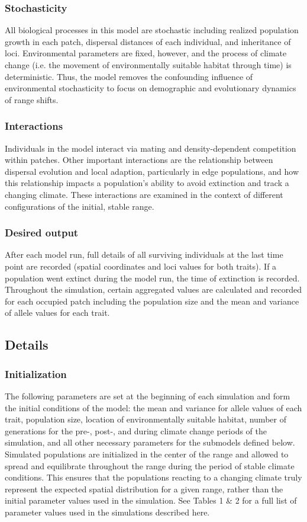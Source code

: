 \documentclass[11pt, oneside]{article}
\begin{document}
\subsubsection{Stochasticity}
All biological processes in this model are stochastic including realized population growth in each patch, dispersal distances of each individual, and inheritance of loci. Environmental parameters are fixed, however, and the process of climate change (i.e. the movement of environmentally suitable habitat through time) is deterministic. Thus, the model removes the confounding influence of environmental stochasticity to focus on demographic and evolutionary dynamics of range shifts.

\subsubsection{Interactions}
Individuals in the model interact via mating and density-dependent competition within patches. Other important interactions are the relationship between dispersal evolution and local adaption, particularly in edge populations, and how this relationship impacts a population's ability to avoid extinction and track a changing climate. These interactions are examined in the context of different configurations of the initial, stable range.

\subsubsection{Desired output}
After each model run, full details of all surviving individuals at the last time point are recorded (spatial coordinates and loci values for both traits). If a population went extinct during the model run, the time of extinction is recorded. Throughout the simulation, certain aggregated values are calculated and recorded for each occupied patch including the population size and the mean and variance of allele values for each trait. 

\subsection{Details}
\subsubsection{Initialization}
The following parameters are set at the beginning of each simulation and form the initial conditions of the model: the mean and variance for allele values of each trait, population size, location of environmentally suitable habitat, number of generations for the pre-, post-, and during climate change periods of the simulation, and all other necessary parameters for the submodels defined below. Simulated populations are initialized in the center of the range and allowed to spread and equilibrate throughout the range during the period of stable climate conditions. This ensures that the populations reacting to a changing climate truly represent the expected spatial distribution for a given range, rather than the initial parameter values used in the simulation. See Tables 1 \& 2 for a full list of parameter values used in the simulations described here.
\end{document}
